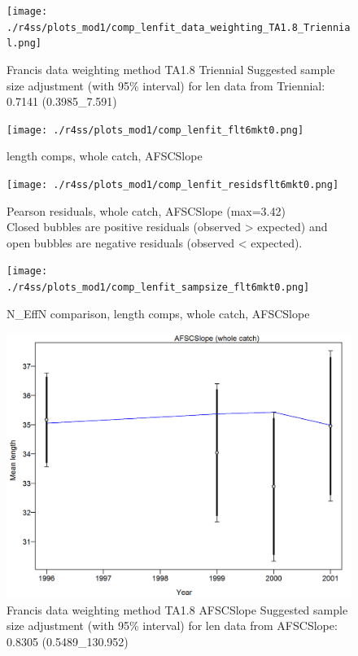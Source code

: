 \documentclass[12pt,]{article}
\begin{document}
\begin{figure}
\centering
\texttt{[image: ./r4ss/plots\_mod1/comp\_lenfit\_data\_weighting\_TA1.8\_Triennial.png]}
\caption{Francis data weighting method TA1.8 Triennial Suggested sample
size adjustment (with 95\% interval) for len data from Triennial: 0.7141
(0.3985\_7.591)
\label{fig:mod1_21_comp_lenfit_data_weighting_TA1.8_Triennial}}
\end{figure}

\begin{figure}
\centering
\texttt{[image: ./r4ss/plots\_mod1/comp\_lenfit\_flt6mkt0.png]}
\caption{length comps, whole catch, AFSCSlope
\label{fig:mod1_22_comp_lenfit_flt6mkt0}}
\end{figure}

\begin{figure}
\centering
\texttt{[image: ./r4ss/plots\_mod1/comp\_lenfit\_residsflt6mkt0.png]}
\caption{Pearson residuals, whole catch, AFSCSlope (max=3.42)\\
Closed bubbles are positive residuals (observed \textgreater{} expected)
and open bubbles are negative residuals (observed \textless{} expected).
\label{fig:mod1_23_comp_lenfit_residsflt6mkt0}}
\end{figure}

\begin{figure}
\centering
\texttt{[image: ./r4ss/plots\_mod1/comp\_lenfit\_sampsize\_flt6mkt0.png]}
\caption{N\_EffN comparison, length comps, whole catch, AFSCSlope
\label{fig:mod1_24_comp_lenfit_sampsize_flt6mkt0}}
\end{figure}

\begin{figure}
\centering
\includegraphics{./r4ss/plots_mod1/comp_lenfit_data_weighting_TA1.8_AFSCSlope.png}
\caption{Francis data weighting method TA1.8 AFSCSlope Suggested sample
size adjustment (with 95\% interval) for len data from AFSCSlope: 0.8305
(0.5489\_130.952)
\label{fig:mod1_25_comp_lenfit_data_weighting_TA1.8_AFSCSlope}}
\end{figure}
\end{document}
